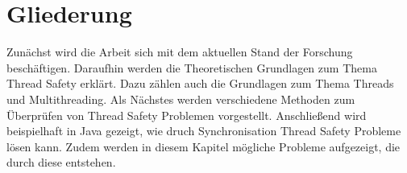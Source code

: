 \section{Gliederung}

Zunächst wird die Arbeit sich mit dem aktuellen Stand der Forschung beschäftigen. Daraufhin werden die Theoretischen Grundlagen zum Thema Thread Safety erklärt. Dazu zählen auch die Grundlagen zum Thema Threads und Multithreading. Als Nächstes werden verschiedene Methoden zum Überprüfen von Thread Safety Problemen vorgestellt. Anschließend wird beispielhaft in Java gezeigt, wie druch Synchronisation Thread Safety Probleme lösen kann. Zudem werden in diesem Kapitel mögliche Probleme aufgezeigt, die durch diese entstehen.